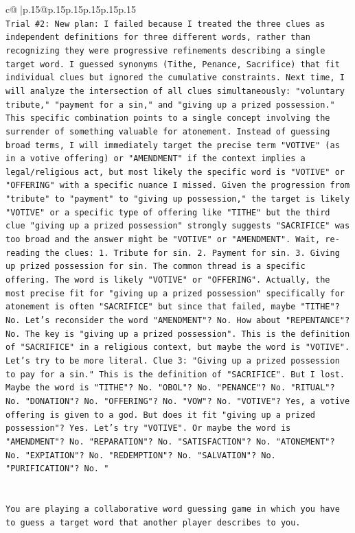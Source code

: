 \documentclass{article}
\begin{document}
{\begin{supertabular}{c@{$\;$}|p{.15\linewidth}@{}p{.15\linewidth}p{.15\linewidth}p{.15\linewidth}p{.15\linewidth}p{.15\linewidth}}
{{{\\ 
\texttt{Trial \#2: New plan: I failed because I treated the three clues as independent definitions for three different words, rather than recognizing they were progressive refinements describing a single target word. I guessed synonyms (Tithe, Penance, Sacrifice) that fit individual clues but ignored the cumulative constraints. Next time, I will analyze the intersection of all clues simultaneously: "voluntary tribute," "payment for a sin," and "giving up a prized possession." This specific combination points to a single concept involving the surrender of something valuable for atonement. Instead of guessing broad terms, I will immediately target the precise term "VOTIVE" (as in a votive offering) or "AMENDMENT" if the context implies a legal/religious act, but most likely the specific word is "VOTIVE" or "OFFERING" with a specific nuance I missed. Given the progression from "tribute" to "payment" to "giving up possession," the target is likely "VOTIVE" or a specific type of offering like "TITHE" but the third clue "giving up a prized possession" strongly suggests "SACRIFICE" was too broad and the answer might be "VOTIVE" or "AMENDMENT". Wait, re{-}reading the clues: 1. Tribute for sin. 2. Payment for sin. 3. Giving up prized possession for sin. The common thread is a specific offering. The word is likely "VOTIVE" or "OFFERING". Actually, the most precise fit for "giving up a prized possession" specifically for atonement is often "SACRIFICE" but since that failed, maybe "TITHE"? No. Let's reconsider the word "AMENDMENT"? No. How about "REPENTANCE"? No. The key is "giving up a prized possession". This is the definition of "SACRIFICE" in a religious context, but maybe the word is "VOTIVE". Let's try to be more literal. Clue 3: "Giving up a prized possession to pay for a sin." This is the definition of "SACRIFICE". But I lost. Maybe the word is "TITHE"? No. "OBOL"? No. "PENANCE"? No. "RITUAL"? No. "DONATION"? No. "OFFERING"? No. "VOW"? No. "VOTIVE"? Yes, a votive offering is given to a god. But does it fit "giving up a prized possession"? Yes. Let's try "VOTIVE". Or maybe the word is "AMENDMENT"? No. "REPARATION"? No. "SATISFACTION"? No. "ATONEMENT"? No. "EXPIATION"? No. "REDEMPTION"? No. "SALVATION"? No. "PURIFICATION"? No. "} \\
\\ 
\\ 
\texttt{You are playing a collaborative word guessing game in which you have to guess a target word that another player describes to you.} \\
}}}
\end{supertabular}}
\end{document}
